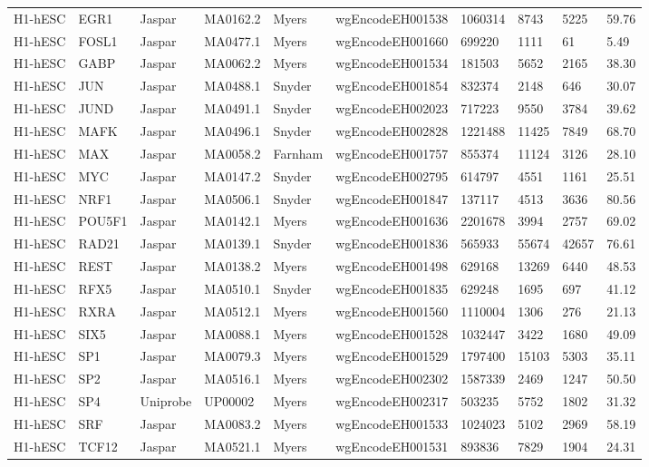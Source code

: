 {\begin{longtable}{p{1.1cm}p{1.0cm}p{1.0cm}p{1.0cm}p{1.0cm}p{2.3cm}p{1.0cm}p{0.8cm}p{0.8cm}p{0.8cm}}
H1-hESC & EGR1 & Jaspar & MA0162.2 & Myers & wgEncodeEH001538 & 1060314 & 8743 & 5225 & 59.76\\
H1-hESC & FOSL1 & Jaspar & MA0477.1 & Myers & wgEncodeEH001660 & 699220 & 1111 & 61 & 5.49\\
H1-hESC & GABP & Jaspar & MA0062.2 & Myers & wgEncodeEH001534 & 181503 & 5652 & 2165 & 38.30\\
H1-hESC & JUN & Jaspar & MA0488.1 & Snyder & wgEncodeEH001854 & 832374 & 2148 & 646 & 30.07\\
H1-hESC & JUND & Jaspar & MA0491.1 & Snyder & wgEncodeEH002023 & 717223 & 9550 & 3784 & 39.62\\
H1-hESC & MAFK & Jaspar & MA0496.1 & Snyder & wgEncodeEH002828 & 1221488 & 11425 & 7849 & 68.70\\
H1-hESC & MAX & Jaspar & MA0058.2 & Farnham & wgEncodeEH001757 & 855374 & 11124 & 3126 & 28.10\\
H1-hESC & MYC & Jaspar & MA0147.2 & Snyder & wgEncodeEH002795 & 614797 & 4551 & 1161 & 25.51\\
H1-hESC & NRF1 & Jaspar & MA0506.1 & Snyder & wgEncodeEH001847 & 137117 & 4513 & 3636 & 80.56\\
H1-hESC & POU5F1 & Jaspar & MA0142.1 & Myers & wgEncodeEH001636 & 2201678 & 3994 & 2757 & 69.02\\
H1-hESC & RAD21 & Jaspar & MA0139.1 & Snyder & wgEncodeEH001836 & 565933 & 55674 & 42657 & 76.61\\
H1-hESC & REST & Jaspar & MA0138.2 & Myers & wgEncodeEH001498 & 629168 & 13269 & 6440 & 48.53\\
H1-hESC & RFX5 & Jaspar & MA0510.1 & Snyder & wgEncodeEH001835 & 629248 & 1695 & 697 & 41.12\\
H1-hESC & RXRA & Jaspar & MA0512.1 & Myers & wgEncodeEH001560 & 1110004 & 1306 & 276 & 21.13\\
H1-hESC & SIX5 & Jaspar & MA0088.1 & Myers & wgEncodeEH001528 & 1032447 & 3422 & 1680 & 49.09\\
H1-hESC & SP1 & Jaspar & MA0079.3 & Myers & wgEncodeEH001529 & 1797400 & 15103 & 5303 & 35.11\\
H1-hESC & SP2 & Jaspar & MA0516.1 & Myers & wgEncodeEH002302 & 1587339 & 2469 & 1247 & 50.50\\
H1-hESC & SP4 & Uniprobe & UP00002 & Myers & wgEncodeEH002317 & 503235 & 5752 & 1802 & 31.32\\
H1-hESC & SRF & Jaspar & MA0083.2 & Myers & wgEncodeEH001533 & 1024023 & 5102 & 2969 & 58.19\\
H1-hESC & TCF12 & Jaspar & MA0521.1 & Myers & wgEncodeEH001531 & 893836 & 7829 & 1904 & 24.31\\

\end{longtable}}

